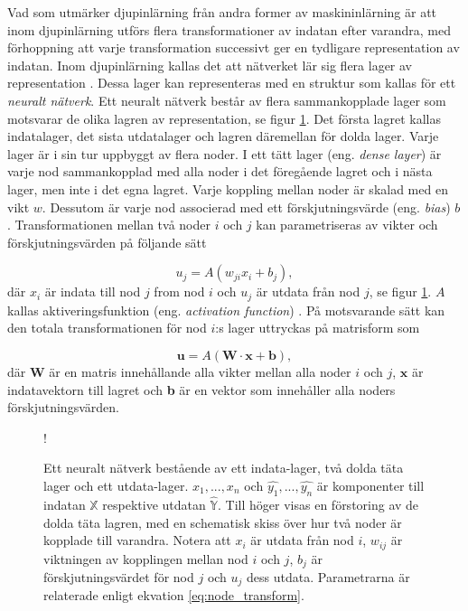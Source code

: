 Vad som utmärker djupinlärning från andra former av maskininlärning är att inom djupinlärning utförs flera transformationer av indatan efter varandra, med förhoppning att varje transformation successivt ger en tydligare representation av indatan. Inom djupinlärning kallas det att nätverket lär sig flera lager av representation \cite{Chollet}. Dessa lager kan representeras med en struktur som kallas för ett \textit{neuralt nätverk}. Ett neuralt nätverk består av flera sammankopplade lager som motsvarar de olika lagren av representation, se figur \ref{fig:general_NN}. Det första lagret kallas indatalager, det sista utdatalager och lagren däremellan för dolda lager. Varje lager är i sin tur uppbyggt av flera noder. I ett tätt lager (eng. \emph{dense layer}) är varje nod sammankopplad med alla noder i det föregående lagret och i nästa lager, men inte i det egna lagret. Varje koppling mellan noder är skalad med en vikt $w$. Dessutom är varje nod associerad med ett förskjutningsvärde (eng. \emph{bias}) $b$. Transformationen mellan två noder $i$ och $j$ kan parametriseras av vikter och förskjutningsvärden på följande sätt 

\begin{equation}
    u_j = A \left(w_{ji}x_i + b_j\right),
    \label{eq:node_transform}
\end{equation}
där $x_i$ är indata till nod $j$ from nod $i$ och $u_j$ är utdata från nod $j$, se figur \ref{fig:general_NN}. $A$ kallas aktiveringsfunktion (eng. \emph{activation function}) \cite{Chollet}. På motsvarande sätt kan den totala transformationen för nod $i$:s lager uttryckas på matrisform som 

\begin{equation}
    \textbf{u} = A(\textbf{W} \cdot \textbf{x} + \textbf{b}),
    \label{eq:network_transform}
\end{equation}
\noindent där $\textbf{W}$ är en matris innehållande alla vikter mellan alla noder $i$ och $j$, $\textbf{x}$ är indatavektorn till lagret och \textbf{b} är en vektor som innehåller alla noders förskjutningsvärden. 

\begin{figure}[hbtp]
    \centering
    \resizebox {0.88\textwidth} {!} {
        
    }
    \caption{Ett neuralt nätverk bestående av ett indata-lager, två dolda täta lager och ett utdata-lager. ${x_1,...,x_n}$ och ${\hat{y_1},...,\hat{y_n}}$ är komponenter till indatan $\mathbb{X}$ respektive utdatan $\mathbb{\hat{Y}}$. Till höger visas en förstoring av de dolda täta lagren, med en schematisk skiss över hur två noder är kopplade till varandra. Notera att $x_i$ är utdata från nod $i$, $w_{ij}$ är viktningen av kopplingen mellan nod $i$ och $j$, $b_j$ är förskjutningsvärdet för nod $j$ och $u_j$ dess utdata. Parametrarna är relaterade enligt ekvation \eqref{eq:node_transform}.}
    \label{fig:general_NN}
\end{figure}

